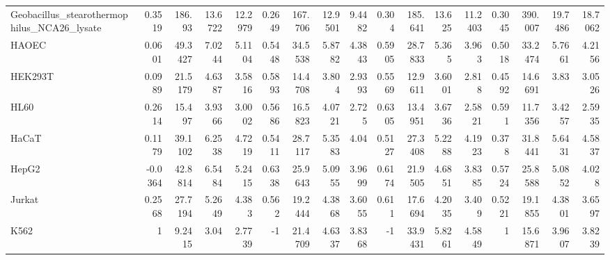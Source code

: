 \begin{tabular}{lrrrrrrrrrrrrrrrr}
 Geobacillus\_stearothermophilus\_NCA26\_lysate &                0.3519 &         186.93   &          13.6722  &          12.2979 &         0.2649   &    167.706  &     12.9501  &     9.4482  &        0.304   &  185.641  &   13.625   &  11.2403  &         0.3045   &    390.007  &     19.7486  &    18.7062  \\
 HAOEC                                       &                0.0601 &          49.3427 &           7.0244  &           5.1104 &         0.5448   &     34.5538 &      5.8782  &     4.3843  &        0.5905  &   28.7833 &    5.365   &   3.963   &         0.5018   &     33.2474 &      5.7661  &     4.2156  \\
 HEK293T                                     &                0.0989 &          21.5179 &           4.6387  &           3.5816 &         0.5893   &     14.4708 &      3.804   &     2.9393  &        0.5569  &   12.9611 &    3.6001  &   2.818   &         0.4592   &     14.6691 &      3.83    &     3.0526  \\
 HL60                                        &                0.2614 &          15.497  &           3.9366  &           3.0002 &         0.5686   &     16.5823 &      4.0721  &     2.725   &        0.6305  &   13.4951 &    3.6736  &   2.5821  &         0.591    &     11.7356 &      3.4257  &     2.5935  \\
 HaCaT                                       &                0.1179 &          39.1102 &           6.2538  &           4.7219 &         0.5411   &     28.7117 &      5.3583  &     4.04    &        0.5127  &   27.3408 &    5.2288  &   4.1923  &         0.378    &     31.8441 &      5.6431  &     4.5837  \\
 HepG2                                       &               -0.0364 &          42.8814 &           6.5484  &           5.2415 &         0.6338   &     25.9643 &      5.0955  &     3.9699  &        0.6174  &   21.9505 &    4.6851  &   3.8385  &         0.5724   &     25.8588 &      5.0852  &     4.028   \\
 Jurkat                                      &                0.2568 &          27.7194 &           5.2649  &           4.383  &         0.562    &     19.2444 &      4.3868  &     3.6055  &        0.611   &   17.6694 &    4.2035  &   3.409   &         0.5221   &     19.1855 &      4.3801  &     3.6597  \\
 K562                                        &                1      &           9.2415 &           3.04    &           2.7739 &        -1        &     21.4709 &      4.6337  &     3.8368  &       -1       &   33.9431 &    5.8261  &   4.5849  &         1        &     15.6871 &      3.9607  &     3.8239  \\

\end{tabular}
